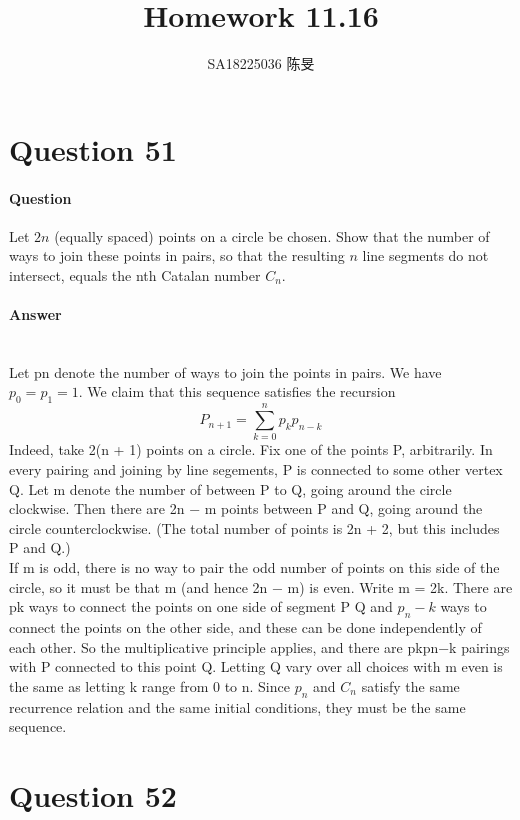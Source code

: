\documentclass[UTF8]{article}
\title{Homework 11.16}
\author{SA18225036 陈旻}
\date{}
\begin{document}
\maketitle
\section{Question 51}
\paragraph{Question}
Let $ 2n $ (equally spaced) points on a circle be chosen. Show
that the number of ways to join these points in pairs, so that the resulting $ n $ line
segments do not intersect, equals the nth Catalan number $ C_n $.
\paragraph{Answer}
    ~\\
    Let pn denote the number of ways to join the points in pairs. We have $p_0 = p_1 =
1$. We claim that this sequence satisfies the recursion
    $$ P_{n +1} = \sum_{k = 0}^n p_k p_{n - k} $$
    Indeed, take 2(n + 1) points on a circle. Fix one of the points P, arbitrarily.
In every pairing and joining by line segements, P is connected to some other
vertex Q. Let m denote the number of between P to Q, going around the circle
clockwise. Then there are 2n − m points between P and Q, going around the
circle counterclockwise. (The total number of points is 2n + 2, but this includes
P and Q.) \\
If m is odd, there is no way to pair the odd number of points on this side of the
circle, so it must be that m (and hence 2n − m) is even. Write m = 2k. There
are pk ways to connect the points on one side of segment P Q and $p_n−k$ ways
to connect the points on the other side, and these can be done independently of
each other. So the multiplicative principle applies, and there are pkpn−k pairings
with P connected to this point Q. Letting Q vary over all choices with m even
is the same as letting k range from 0 to n.
Since $ p_n $ and $ C_n $ satisfy the same recurrence relation and the same initial conditions,
they must be the same sequence.

\section{Question 52}
\end{document}
